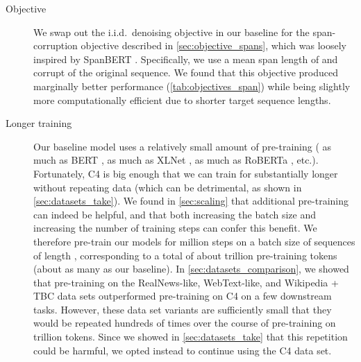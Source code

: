 \documentclass[twoside,11pt]{article}
\begin{document}
\begin{description}

\item[Objective] We swap out the i.i.d.\ denoising objective in our baseline for the span-corruption objective described in \cref{sec:objective_spans}, which was loosely inspired by SpanBERT \citep{joshi2019spanbert}.
Specifically, we use a mean span length of  and corrupt  of the original sequence.
We found that this objective produced marginally better performance (\cref{tab:objectives_span}) while being slightly more computationally efficient due to shorter target sequence lengths.

\item[Longer training] Our baseline model uses a relatively small amount of pre-training ( as much as BERT \citep{devlin2018bert},  as much as XLNet \citep{yang2019xlnet},  as much as RoBERTa \citep{liu2019roberta}, etc.).
Fortunately, C4 is big enough that we can train for substantially longer without repeating data (which can be detrimental, as shown in \cref{sec:datasets_take}).
We found in \cref{sec:scaling} that additional pre-training can indeed be helpful, and that both increasing the batch size and increasing the number of training steps can confer this benefit.
We therefore pre-train our models for  million steps on a batch size of  sequences of length , corresponding to a total of about  trillion pre-training tokens (about  as many as our baseline).
In \cref{sec:datasets_comparison}, we showed that pre-training on the RealNews-like, WebText-like, and Wikipedia + TBC data sets outperformed pre-training on C4 on a few downstream tasks.
However, these data set variants are sufficiently small that they would be repeated hundreds of times over the course of pre-training on  trillion tokens.
Since we showed in \cref{sec:datasets_take} that this repetition could be harmful, we opted instead to continue using the C4 data set.


\end{description}
\end{document}

